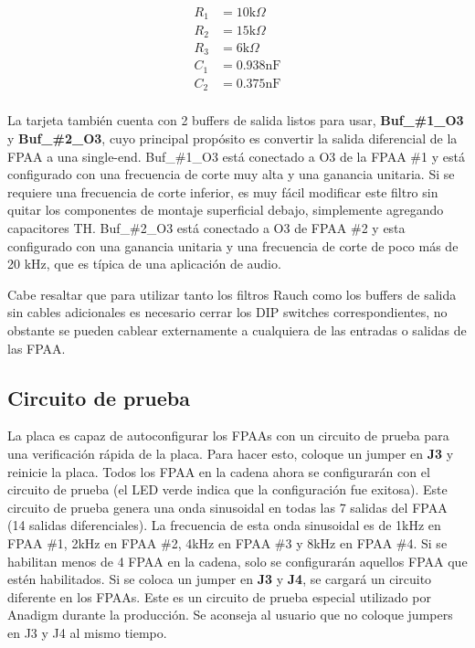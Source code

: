 	\begin{align*}
		R_{1}	&=	10\mathrm{k}\Omega\\
		R_{2}	&=	15\mathrm{k}\Omega\\
		R_{3}	&=	6\mathrm{k}\Omega\\
		C_{1}	&=	0.938\mathrm{nF}\\
		C_{2}	&=	0.375\mathrm{nF}\\
	\end{align*}
	
\cite{Muniz-Montero2017}
	
	La tarjeta también cuenta con 2 buffers de salida listos para usar, \textbf{Buf\_\#1\_O3} y  \textbf{Buf\_\#2\_O3}, cuyo principal propósito es convertir la salida diferencial de la FPAA a una single-end. 
	Buf\_\#1\_O3 está conectado a O3 de la FPAA \#1 y está configurado con una frecuencia de corte muy alta y una ganancia unitaria. Si se requiere una frecuencia de corte inferior, es muy fácil modificar este filtro sin quitar los componentes de montaje superficial debajo, simplemente agregando capacitores TH. Buf\_\#2\_O3 está conectado a O3 de FPAA \#2 y esta configurado con una ganancia unitaria y una frecuencia de corte de poco más de 20 kHz, que es típica de una aplicación de audio. 
	
	Cabe resaltar que para utilizar tanto los filtros Rauch como los buffers de salida sin cables adicionales es necesario cerrar los DIP switches correspondientes, no obstante se pueden cablear externamente a cualquiera de las entradas o salidas de las FPAA.
	
		\subsection{Circuito de prueba}

La placa es capaz de autoconfigurar los FPAAs con un circuito de prueba para una verificación rápida de la placa. Para hacer esto, coloque un jumper en \textbf{J3} y reinicie la placa. Todos los FPAA en la cadena ahora se configurarán con el circuito de prueba (el LED verde indica que la configuración fue exitosa). Este circuito de prueba genera una onda sinusoidal en todas las 7 salidas del FPAA (14 salidas diferenciales). La frecuencia de esta onda sinusoidal es de 1kHz en FPAA \#{}1, 2kHz en FPAA \#{}2, 4kHz en FPAA \#{}3 y 8kHz en FPAA \#{}4. Si se habilitan menos de 4 FPAA en la cadena, solo se configurarán aquellos FPAA que estén habilitados. Si se coloca un jumper en \textbf{J3} y \textbf{J4}, se cargará un circuito diferente en los FPAAs. Este es un circuito de prueba especial utilizado por Anadigm durante la producción. Se aconseja al usuario que no coloque jumpers en J3 y J4 al mismo tiempo.

